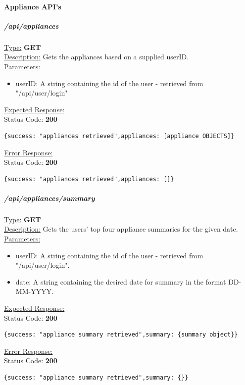 \documentclass[preprint,12pt,3p]{elsarticle}
\newcommand{\forceindent}{\leavevmode{\parindent=1em\indent}}
\begin{document}
\paragraph{Appliance API's}
\subparagraph*{/api/appliances}
\underline{Type:} \textbf{GET}\\

\underline{Description:} Gets the appliances based on a supplied userID.\\

\underline{Parameters:}
\begin{itemize}
\item userID: A string containing the id of the user - retrieved from "/api/user/login"
\end{itemize}
\underline{Expected Response:}\\[5pt]
\forceindent Status Code: \textbf{200} \\
\begin{verbatim}
{success: "appliances retrieved",appliances: [appliance OBJECTS]}
\end{verbatim}
\underline{Error Response:}\\[5pt]
\forceindent Status Code: \textbf{200} \\
\begin{verbatim}
{success: "appliances retrieved",appliances: []}
\end{verbatim}

\subparagraph*{/api/appliances/summary}
\underline{Type:} \textbf{GET}\\

\underline{Description:} Gets the users' top four appliance summaries for the given date.\\

\underline{Parameters:}
\begin{itemize}
\item userID: A string containing the id of the user - retrieved from "/api/user/login".

\item date: A string containing the desired date for summary in the format DD-MM-YYYY.

\end{itemize}
\underline{Expected Response:}\\[5pt]
\forceindent Status Code: \textbf{200} \\
\begin{verbatim}
{success: "appliance summary retrieved",summary: {summary object}}
\end{verbatim}
\underline{Error Response:}\\[5pt]
\forceindent Status Code: \textbf{200} \\
\begin{verbatim}
{success: "appliance summary retrieved",summary: {}}
\end{verbatim}
\end{document}
